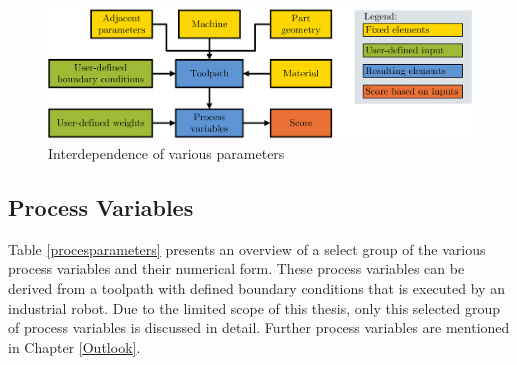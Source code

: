\begin{figure}[H]
	\centerline{\includegraphics[width=1\textwidth]{figures/BasicScore.png}}
	\caption{Interdependence of various parameters}
	\label{BasicScore}
\end{figure}





\subsection{Process Variables}\label{pp}


Table \ref{procesparameters} presents an overview of a select group of the various process variables and their numerical form. These process variables can be derived from a toolpath with defined boundary conditions that is executed by an industrial robot. Due to the limited scope of this thesis, only this selected group of process variables is discussed in detail. Further process variables are mentioned in Chapter \ref{Outlook}.



